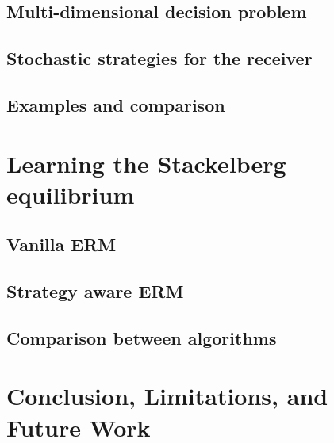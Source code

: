 \subsection{Multi-dimensional decision problem}\label{subsec:Multidimensional decision problem}

    
\subsection{Stochastic strategies for the receiver}\label{subsec:Stochastic strategy}


\subsection{Examples and comparison}\label{subsec:Examples and comparision}


\section{Learning the Stackelberg equilibrium}\label{sec:Learning problem}


\subsection{Vanilla ERM}\label{subsec:Vanilla ERM}


\subsection{Strategy aware ERM}\label{subsec:Stragically aware ERM}


\subsection{Comparison between algorithms}\label{subsec:comparision}


\section{Conclusion, Limitations, and Future Work}


